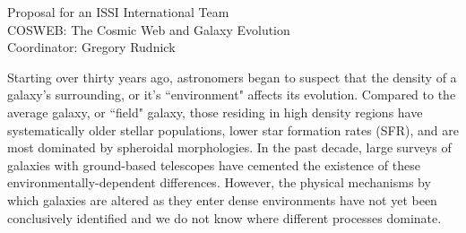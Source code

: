 \documentclass[11pt]{article}
\newcommand{\HRule}{\rule{\linewidth}{0.3mm}}
\begin{document}






\begin{center}
\large{Proposal for an ISSI International Team}\\
\Large{COSWEB: The Cosmic Web and Galaxy Evolution}\\
\medskip
\vspace{-0.2cm}
\large{Coordinator: Gregory Rudnick}\\
\end{center}

Starting over thirty years ago, astronomers began to suspect that the density of a galaxy's surrounding, or it's ``environment" affects its evolution.  Compared to the average galaxy, or ``field" galaxy, those residing in high density regions have systematically older stellar populations, lower star formation rates (SFR), and are most dominated by spheroidal morphologies.  In the past decade, large surveys of galaxies with ground-based telescopes have cemented the existence of these environmentally-dependent differences. However, the physical mechanisms by which galaxies are altered as they enter dense environments have not yet been conclusively identified and we do not know where different processes dominate.
\end{document}
